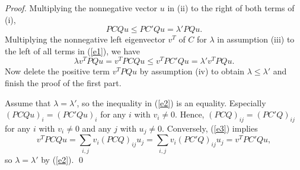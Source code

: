 \documentclass[12pt]{report}%
\theoremstyle{plain}
\theoremstyle{definition}
\begin{document}
\begin{proof}
            Multiplying the nonnegative vector $u$ in (ii) to the right of both terms of  (i),
        \begin{equation}
            \label{e1}
            PCQu\leq PC'Qu=\lambda'PQu.
        \end{equation}
        Multiplying the nonnegative left eigenvector $v^T$ of $C$ for $\lambda$ in assumption (iii) to the left of all terms  in (\ref{e1}), we have
        \begin{equation}
            \label{e2}
            \lambda v^TPQu=v^TPCQu\leq v^TPC'Qu=\lambda' v^TPQu.
        \end{equation}
        Now delete the positive term $v^TPQu$ by assumption (iv) to obtain $\lambda\leq \lambda'$ and finish the proof of the first part.



        Assume that $\lambda=\lambda'$, so the inequality in (\ref{e2}) is an equality.  Especially $(PCQu)_i=(PC'Qu)_i$ for any $i$ with $v_i\not=0.$ Hence, $(PCQ)_{ij}=(PC'Q)_{ij}$ for any $i$ with $v_i\not=0$ and any $j$ with $u_j\not=0.$
         Conversely, (\ref{e3}) implies $$v^TPCQu=\sum_{i,j} v_i(PCQ)_{ij}u_j=\sum_{i,j} v_i(PC'Q)_{ij}u_j=v^TPC'Qu,$$ so
            $\lambda=\lambda'$ by (\ref{e2}). \qed

 \end{proof}
 
 
 
\end{document}
